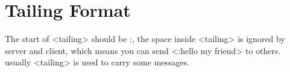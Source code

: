\documentclass[oneside,titlepage,a4paper]{Definition/retrospy} %
\begin{document}
\section{Tailing Format}
The start of <tailing> should be :, the space inside <tailing> is ignored by server and client, which means you can send <:hello my friend> to others. usually <tailing> is used to carry some messages.
%		
%			
%			
%	
%
%			
%
%
%
%
%
\end{document}
